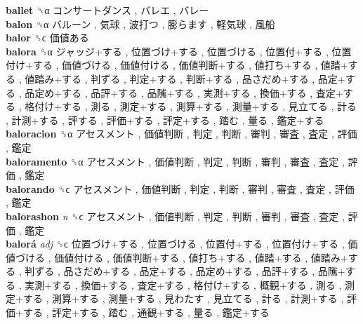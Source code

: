 \textbf{ballet} ␝α   コンサートダンス ,  バレエ ,  バレー   \\
\textbf{balon} ␝α   バルーン ,  気球 ,  波打つ ,  膨らます ,  軽気球 ,  風船   \\
\textbf{balor} ␝ϲ   価値ある   \\
\textbf{balora} ␝α   ジャッジ+する ,  位置づけ+する ,  位置づける ,  位置付+する ,  位置付け+する ,  価値づける ,  価値付ける ,  価値判断+する ,  値打ち+する ,  値踏+する ,  値踏み+する ,  判ずる ,  判定+する ,  判断+する ,  品さだめ+する ,  品定+する ,  品定め+する ,  品評+する ,  品隲+する ,  実測+する ,  換価+する ,  査定+する ,  格付け+する ,  測る ,  測定+する ,  測算+する ,  測量+する ,  見立てる ,  計る ,  計測+する ,  評する ,  評価+する ,  評定+する ,  踏む ,  量る ,  鑑定+する   \\
\textbf{baloracion} ␝α   アセスメント ,  価値判断 ,  判定 ,  判断 ,  審判 ,  審査 ,  査定 ,  評価 ,  鑑定   \\
\textbf{baloramento} ␝α   アセスメント ,  価値判断 ,  判定 ,  判断 ,  審判 ,  審査 ,  査定 ,  評価 ,  鑑定   \\
\textbf{balorando} ␝ϲ   アセスメント ,  価値判断 ,  判定 ,  判断 ,  審判 ,  審査 ,  査定 ,  評価 ,  鑑定   \\
\textbf{balorashon} \emph{n}  ␝ϲ   アセスメント ,  価値判断 ,  判定 ,  判断 ,  審判 ,  審査 ,  査定 ,  評価 ,  鑑定   \\
\textbf{balorá} \emph{adj}  ␝ϲ   位置づけ+する ,  位置づける ,  位置付+する ,  位置付け+する ,  価値づける ,  価値付ける ,  価値判断+する ,  値打ち+する ,  値踏+する ,  値踏み+する ,  判ずる ,  品さだめ+する ,  品定+する ,  品定め+する ,  品評+する ,  品隲+する ,  実測+する ,  換価+する ,  査定+する ,  格付け+する ,  概観+する ,  測る ,  測定+する ,  測算+する ,  測量+する ,  見わたす ,  見立てる ,  計る ,  計測+する ,  評価+する ,  評定+する ,  踏む ,  通観+する ,  量る ,  鑑定+する   \\
